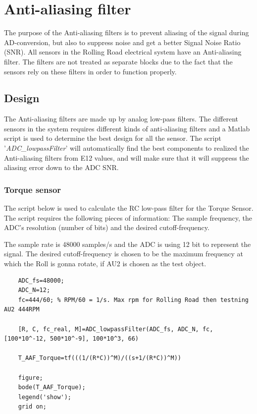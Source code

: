 \newpage
\section{Anti-aliasing filter}
The purpose of the Anti-aliasing filters is to prevent aliasing of the signal during AD-conversion, but also to suppress noise and get a better Signal Noise Ratio (SNR). All sensors in the Rolling Road electrical system have an Anti-aliasing filter.
The filters are not treated as separate blocks due to the fact that the sensors rely on these filters in order to function properly.


\subsection{Design}
The Anti-aliasing filters are made up by analog low-pass filters. The different sensors in the system requires different kinds of anti-aliasing filters and a Matlab script is used to determine the best design for all the sensor.
The script '\textit{ADC\_lowpassFilter}' will automatically find the best components to realized the Anti-aliasing filters from E12 values, and will make sure that it will suppress the aliasing error down to the ADC SNR. 
	
\subsubsection*{Torque sensor}
The script below is used to calculate the RC low-pass filter for the Torque Sensor. The script requires the following pieces of information: The sample frequency, the ADC's resolution (number of bits) and the desired cutoff-frequency.

The sample rate is 48000 samples/s and the ADC is using 12 bit to represent the signal. The desired cutoff-frequency is chosen to be the maximum frequency at which the Roll is gonna rotate, if AU2 is chosen as the test object.
\lstset{language=MATLAB}
\begin{lstlisting}
	ADC_fs=48000;
	ADC_N=12;
	fc=444/60; % RPM/60 = 1/s. Max rpm for Rolling Road then testning AU2 444RPM
	
	[R, C, fc_real, M]=ADC_lowpassFilter(ADC_fs, ADC_N, fc, [100*10^-12, 500*10^-9], 100*10^3, 66)
	
	T_AAF_Torque=tf(((1/(R*C))^M)/((s+1/(R*C))^M))
	
	figure;
	bode(T_AAF_Torque);
	legend('show');
	grid on;
\end{lstlisting}
	
